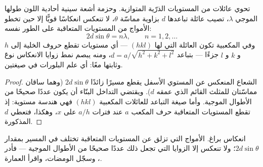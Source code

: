 \begin{proposition}\label{prop:b3:crystalline-solids:bragg}
تحوي  عائلات من المستويات الذرّية المتوازية. وحزمة
أشعة سينية أحادية اللون طولها الموجي $\lambda$، تصيب عائلة
تباعدها $d$ بزاوية مماسّة $\theta$، لا تنعكس انعكاسًا قويًّا إلا
حين تخطو الأمواج من المستويات المتعاقبة على الطور نفسه:
\[
2d\sin\theta = n\lambda , \qquad n = 1, 2, \dots
\]
وفي  المكعبية تكون العائلة التي \emph{} لها
$(hkl)$ --- أي مستويات تقطع حروف الخلية إلى $h$ و $k$ و $l$ جزءًا
--- بتباعد $d = a/\sqrt{h^2 + k^2 + l^2}$، ومنه يبصم نمط
زوايا الانعكاس نوعَ  وثابتها معًا:
أي علم البلورات في صيغتين.
\end{proposition}

\begin{proof}
الشعاع المنعكس عن المستوي الأسفل يقطع مسيرًا زائدًا $2d
\sin\theta$ (وهما ساقان مماسّتان للمثلث القائم الذي عمقه $d$).
ويقتضي التداخل البنّاء أن يكون عددًا صحيحًا من
الأطوال الموجية. وأما صيغة التباعد للعائلات المكعبية $(hkl)$ فهي
هندسة مستوية: إذ تقطع المستويات المتعاقبة حرف المكعب $a$ عند
فترات $a/h$ على $x$، وهكذا، فتعطي $d$ المذكورة.
\end{proof}

\begin{omfigure}

{\small انعكاس براغ. الأمواج التي تزلق عن المستويات المتعاقبة
تختلف في المسير بمقدار $2d\sin\theta$؛ ولا تنعكس إلا الزوايا التي تجعل ذلك عددًا
صحيحًا من الأطوال الموجية --- فأدر ، وسجّل
الومضات، واقرأ العمارة.}
\end{omfigure}


